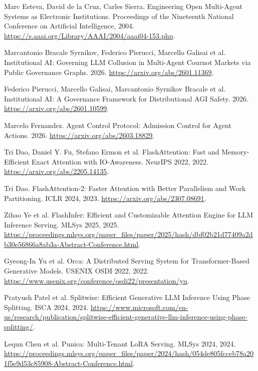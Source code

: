  Marc Esteva, David de la Cruz, Carles Sierra. Engineering Open Multi-Agent Systems as Electronic Institutions. Proceedings of the Nineteenth National Conference on Artificial Intelligence, 2004. \url{https://s.aaai.org/Library/AAAI/2004/aaai04-153.php}.

 Marcantonio Bracale Syrnikov, Federico Pierucci, Marcello Galisai et al. Institutional {AI}: Governing {LLM} Collusion in Multi-Agent {Cournot} Markets via Public Governance Graphs. 2026. \url{https://arxiv.org/abs/2601.11369}.

 Federico Pierucci, Marcello Galisai, Marcantonio Syrnikov Bracale et al. Institutional {AI}: A Governance Framework for Distributional {AGI} Safety. 2026. \url{https://arxiv.org/abs/2601.10599}.

 Marcelo Fernandez. Agent Control Protocol: Admission Control for Agent Actions. 2026. \url{https://arxiv.org/abs/2603.18829}.

 Tri Dao, Daniel Y. Fu, Stefano Ermon et al. FlashAttention: Fast and Memory-Efficient Exact Attention with IO-Awareness. NeurIPS 2022, 2022. \url{https://arxiv.org/abs/2205.14135}.

 Tri Dao. FlashAttention-2: Faster Attention with Better Parallelism and Work Partitioning. ICLR 2024, 2023. \url{https://arxiv.org/abs/2307.08691}.

 Zihao Ye et al. FlashInfer: Efficient and Customizable Attention Engine for LLM Inference Serving. MLSys 2025, 2025. \url{https://proceedings.mlsys.org/paper_files/paper/2025/hash/dbf02b21d77409a2db30e56866a8ab3a-Abstract-Conference.html}.

 Gyeong-In Yu et al. Orca: A Distributed Serving System for Transformer-Based Generative Models. USENIX OSDI 2022, 2022. \url{https://www.usenix.org/conference/osdi22/presentation/yu}.

 Pratyush Patel et al. Splitwise: Efficient Generative LLM Inference Using Phase Splitting. ISCA 2024, 2024. \url{https://www.microsoft.com/en-us/research/publication/splitwise-efficient-generative-llm-inference-using-phase-splitting/}.

 Lequn Chen et al. Punica: Multi-Tenant LoRA Serving. MLSys 2024, 2024. \url{https://proceedings.mlsys.org/paper_files/paper/2024/hash/054de805fcceb78a201f5e9d53c85908-Abstract-Conference.html}.
